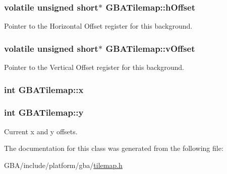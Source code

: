 \hypertarget{class_g_b_a_tilemap_a4e59c0ad01395ffaa5b3e6ce978c41cf}{
\subsubsection[{h\-Offset}]{\setlength{\rightskip}{0pt plus 5cm}volatile unsigned short$\ast$ {\bf G\-B\-A\-Tilemap\-::h\-Offset}}}\label{class_g_b_a_tilemap_a4e59c0ad01395ffaa5b3e6ce978c41cf}


Pointer to the Horizontal Offset register for this background. 

\hypertarget{class_g_b_a_tilemap_a1adc8cd141d27745c504a0f04ad107a1}{
\subsubsection[{v\-Offset}]{\setlength{\rightskip}{0pt plus 5cm}volatile unsigned short$\ast$ {\bf G\-B\-A\-Tilemap\-::v\-Offset}}}\label{class_g_b_a_tilemap_a1adc8cd141d27745c504a0f04ad107a1}


Pointer to the Vertical Offset register for this background. 

\hypertarget{class_g_b_a_tilemap_ae83d6511d021d12d55c9fa4613113998}{
\subsubsection[{x}]{\setlength{\rightskip}{0pt plus 5cm}int {\bf G\-B\-A\-Tilemap\-::x}}}\label{class_g_b_a_tilemap_ae83d6511d021d12d55c9fa4613113998}
\hypertarget{class_g_b_a_tilemap_aa18154630ab0e96309fab9e7226a02a0}{
\subsubsection[{y}]{\setlength{\rightskip}{0pt plus 5cm}int {\bf G\-B\-A\-Tilemap\-::y}}}\label{class_g_b_a_tilemap_aa18154630ab0e96309fab9e7226a02a0}


Current x and y offsets. 



The documentation for this class was generated from the following file\-:\begin{DoxyCompactItemize}
\item 
G\-B\-A/include/platform/gba/\hyperlink{_g_b_a_2include_2platform_2gba_2tilemap_8h}{tilemap.\-h}\end{DoxyCompactItemize}
